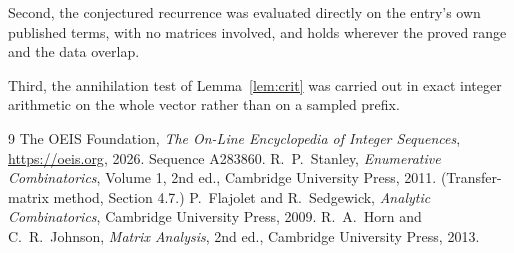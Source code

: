 \documentclass[11pt,a4paper]{article}
\theoremstyle{plain}
\theoremstyle{definition}
\begin{document}
Second, the conjectured recurrence was evaluated directly on the entry's own published terms,
with no matrices involved, and holds wherever the proved range and the data overlap.

Third, the annihilation test of Lemma~\ref{lem:crit} was carried out in exact integer
arithmetic on the whole vector rather than on a sampled prefix.

\begin{thebibliography}{9}
 The OEIS Foundation, \emph{The On-Line Encyclopedia of Integer
Sequences}, \url{https://oeis.org}, 2026. Sequence A283860.
 R.~P.~Stanley, \emph{Enumerative Combinatorics}, Volume 1, 2nd ed.,
Cambridge University Press, 2011. (Transfer-matrix method, Section 4.7.)
 P.~Flajolet and R.~Sedgewick, \emph{Analytic Combinatorics}, Cambridge
University Press, 2009.
 R.~A.~Horn and C.~R.~Johnson, \emph{Matrix Analysis}, 2nd ed., Cambridge
University Press, 2013.
\end{thebibliography}
\end{document}
